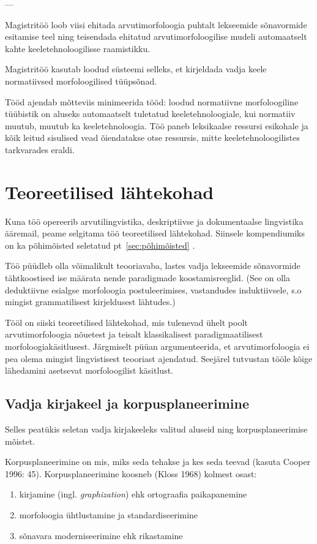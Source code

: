 \documentclass[12pt,a4paper]{article}
\begin{document}
---


Magistritöö loob viisi ehitada arvutimorfoloogia puhtalt lekseemide sõnavormide esitamise teel ning teisendada ehitatud arvutimorfoloogilise mudeli automaatselt kahte keeletehnoloogilisse raamistikku.

Magistritöö kasutab loodud süsteemi selleks, et kirjeldada vadja keele normatiivsed morfoloogilised tüüpsõnad.

Tööd ajendab mõtteviis minimeerida tööd: loodud normatiivne morfoloogiline tüübistik on aluseks automaatselt tuletatud keeletehnoloogiale, kui normatiiv muutub, muutub ka keeletehnoloogia. Töö paneb leksikaalse ressursi esikohale ja kõik leitud sisulised vead õiendatakse otse ressursis, mitte keeletehnoloogilistes tarkvarades eraldi.




\newpage
\section{Teoreetilised lähtekohad}
Kuna töö opereerib arvutilingvistika, deskriptiivse ja dokumentaalse lingvistika ääremail, peame selgitama töö teoreetilised lähtekohad. Siinsele kompendiumiks on ka põhimõisted seletatud pt~\ref{sec:põhimõisted} .

Töö püüdleb olla võimalikult teooriavaba, lastes vadja lekseemide sõnavormide tähtkoostised ise määrata nende paradigmade koostamis\-reeglid. (See on olla deduktiivne esialgse morfoloogia postuleerimises, vastandudes induktiivsele, s.o mingist grammatilisest kirjeldusest lähtudes.)

Tööl on siiski teoreetilised lähtekohad, mis tulenevad ühelt poolt arvutimorfoloogia nõuetest ja teisalt klassikalisest paradigmaatilisest morfoloogiakäsitlusest. Järgmiselt püüan argumenteerida, et arvutimorfoloogia ei pea olema mingist lingvistisest teooriast ajendatud. Seejärel tutvustan tööle kõige lähedamini asetsevat morfoloogilist käsitlust.


\subsection{Vadja kirjakeel ja korpusplaneerimine}

Selles peatükis seletan vadja kirjakeeleks valitud aluseid ning korpusplaneerimise mõistet.

Korpusplaneerimine on mis, miks seda tehakse ja kes seda teevad (kasuta Cooper 1996: 45). Korpusplaneerimine koosneb (Kloss 1968) kolmest osast:
\begin{enumerate}
\item kirjamine (ingl. \textit{graphization}) ehk ortograafia paikapanemine
\item morfoloogia ühtlustamine ja standardiseerimine
\item sõnavara moderniseerimine ehk rikastamine
\end{enumerate}
\end{document}
